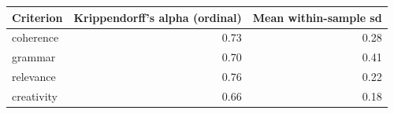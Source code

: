 \begin{tabular}{lrr}
\toprule
Criterion & Krippendorff's alpha (ordinal) & Mean within-sample sd \\
\midrule
coherence & 0.73 & 0.28 \\
grammar & 0.70 & 0.41 \\
relevance & 0.76 & 0.22 \\
creativity & 0.66 & 0.18 \\
\bottomrule
\end{tabular}
